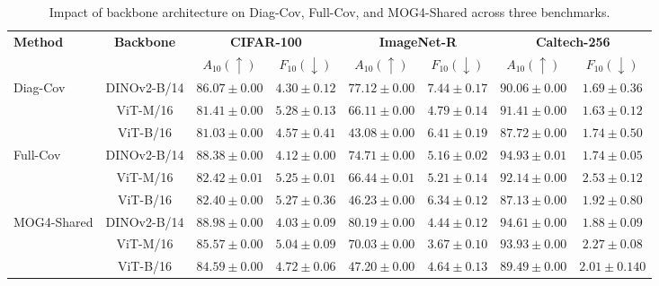 \begin{table}[htb]
	\centering
	\caption{Impact of backbone architecture on Diag-Cov, Full-Cov, and MOG4-Shared across three benchmarks.}
	\label{tab:multi_backbone_results}
	\begin{adjustbox}{width=0.9\columnwidth, center}
		\small
		\setlength{\tabcolsep}{3.5pt}
		\begin{tabular}{l|c|cc|cc|cc}
			\hline
			\multirow{2}{*}{\textbf{Method}} & \multirow{2}{*}{\textbf{Backbone}} & \multicolumn{2}{c|}{\textbf{CIFAR-100}} & \multicolumn{2}{c|}{\textbf{ImageNet-R}} & \multicolumn{2}{c}{\textbf{Caltech-256}} \\
			\cline{3-8}
			& & $A_{10} (\uparrow)$ & $F_{10} (\downarrow)$ & $A_{10} (\uparrow)$ & $F_{10} (\downarrow)$ & $A_{10} (\uparrow)$ & $F_{10} (\downarrow)$ \\
			\hline
			\multirow{3}{*}{Diag-Cov}
			& DINOv2-B/14 & $86.07 \pm 0.00$ & $4.30 \pm 0.12$ & $\mathbf{77.12 \pm 0.00}$ & $7.44 \pm 0.17$ & $90.06 \pm 0.00$ & $1.69 \pm 0.36$ \\
			& ViT-M/16    & $81.41 \pm 0.00$ & $5.28 \pm 0.13$ & $66.11 \pm 0.00$ & $\mathbf{4.79 \pm 0.14}$ & $\mathbf{91.41 \pm 0.00}$ & $\mathbf{1.63 \pm 0.12}$ \\
			& ViT-B/16    & $81.03 \pm 0.00$ & $4.57 \pm 0.41$ & $43.08 \pm 0.00$ & $6.41 \pm 0.19$ & $87.72 \pm 0.00$ & $1.74 \pm 0.50$ \\
			\hline
			\multirow{3}{*}{Full-Cov}
			& DINOv2-B/14 & $\mathbf{88.38 \pm 0.00}$ & $\mathbf{4.12 \pm 0.00}$ & $74.71 \pm 0.00$ & $5.16 \pm 0.02$ & $\mathbf{94.93 \pm 0.01}$ & $1.74 \pm 0.05$ \\
			& ViT-M/16    & $82.42 \pm 0.01$ & $5.25 \pm 0.01$ & $66.44 \pm 0.01$ & $5.21 \pm 0.14$ & $92.14 \pm 0.00$ & $2.53 \pm 0.12$ \\
			& ViT-B/16    & $82.40 \pm 0.00$ & $5.27 \pm 0.36$ & $46.23 \pm 0.00$ & $6.34 \pm 0.12$ & $87.13 \pm 0.00$ & $1.92 \pm 0.80$ \\
			\hline
			\multirow{3}{*}{MOG4-Shared}
			& DINOv2-B/14 & $\mathbf{88.98 \pm 0.00}$ & $4.03 \pm 0.09$ & $\mathbf{80.19 \pm 0.00}$ & $\mathbf{4.44 \pm 0.12}$ & $94.61 \pm 0.00$ & $1.88 \pm 0.09$ \\
			& ViT-M/16    & $85.57 \pm 0.00$ & $5.04 \pm 0.09$ & $70.03 \pm 0.00$ & $3.67 \pm 0.10$ & $93.93 \pm 0.00$ & $2.27 \pm 0.08$ \\
			& ViT-B/16    & $84.59 \pm 0.00$ & $4.72 \pm 0.06$ & $47.20 \pm 0.00$ & $4.64 \pm 0.13$ & $89.49 \pm 0.00$ & $2.01 \pm 0.140$ \\
			\hline
		\end{tabular}
	\end{adjustbox}
\end{table}

